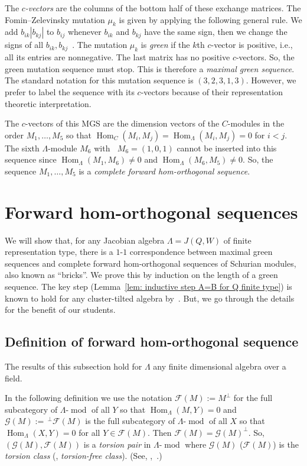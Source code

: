 \documentclass[ALCO,ThmDefs,Unicode,epreuves]{cedram}
\DeclareMathOperator{\Hom}{Hom}%
\DeclareMathOperator{\undim}{\underline{dim}}
\DeclareMathOperator{\modr}{mod}
\newcommand{\cF}{\ensuremath{{\mathcal{F}}}}
\newcommand{\cG}{\ensuremath{{\mathcal{G}}}}
\begin{document}
The \emph{$c$-vectors} are the columns of the bottom half of these exchange matrices. The Fomin--Zelevinsky mutation $\mu_k$ is given by applying the following general rule. We add $b_{ik}|b_{kj}|$ to $b_{ij}$ whenever $b_{ik}$ and $b_{kj}$ have the same sign, then we change the signs of all $b_{ik},b_{kj}$~\cite{FZ4}. The mutation $\mu_k$ is \emph{green} if the $k$th $c$-vector is positive, i.e., all its entries are nonnegative. The last matrix has no positive $c$-vectors. So, the green mutation sequence must stop. This is therefore a \emph{maximal green sequence}. The standard notation for this mutation sequence is $(3,2,3,1,3)$. However, we prefer to label the sequence with its $c$-vectors because of their representation theoretic interpretation.


The $c$-vectors of this MGS are the dimension vectors of the $C$-modules in the order $M_1,\ldots,M_5$ so that $\Hom_{C}(M_i,M_j)=\Hom_{\Lambda}(M_i,M_j)=0$ for $i<j$. The sixth $\Lambda$-module $M_6$ with $\undim M_6=(1,0,1)$ cannot be inserted into this sequence since $\Hom_\Lambda(M_1,M_6)\neq 0$ and $\Hom_\Lambda(M_6,M_5)\neq 0$. So, the sequence $M_1,\ldots,M_5$ is a \emph{complete forward hom-orthogonal sequence}.

\section{Forward hom-orthogonal sequences}\label{sect2}


We will show that, for any Jacobian algebra $\Lambda=J(Q,W)$ of finite representation type, there is a $1$-$1$ correspondence between maximal green sequences and complete forward hom-orthogonal sequences of Schurian modules, also known as ``bricks''. We prove this by induction on the length of a green sequence. The key step (Lemma~\ref{lem: inductive step A=B for Q finite type}) is known to hold for any cluster-tilted algebra by~\cite{BIRSm}.
But, we go through the details for the benefit of our students.
\subsection{Definition of forward hom-orthogonal sequence}

The results of this subsection hold for $\Lambda$ any finite dimensional algebra over a field.

In the following definition we use the notation $\cF(M):=M^\perp$ for the full subcategory of $\Lambda\text{-}\modr$ of all $Y$ so that $\Hom_\Lambda(M,Y)=0$ and $\cG(M):=\,^\perp\cF(M)$ is the full subcategory of $\Lambda\text{-}\modr$ of all $X$ so that $\Hom_\Lambda(X,Y)=0$ for all $Y\in\cF(M)$. Then $\cF(M)=\cG(M)^\perp$. So, $(\cG(M),\cF(M))$ is a \emph{torsion pair} in $\Lambda\text{-}\modr$ where $\cG(M)$ (\resp  $\cF(M)$) is the \emph{torsion class} (\resp , \emph{torsion-free class}). (See, \eg ,~\cite{BeRe}.) 
\end{document}
